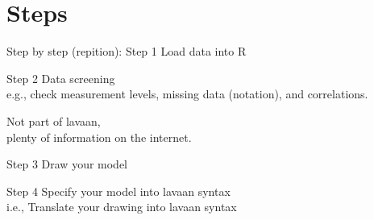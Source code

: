 \documentclass[10pt]{beamer}\usepackage[]{graphicx}\usepackage[]{xcolor}
\begin{document}
%
%
%
%
%
%
%
%
%
%
%
%
\section{Steps}
%
\begin{frame}{Step by step (repition): Step 1}
\Large Load data into R 
\end{frame}
\begin{frame}{Step 2}
\Large Data screening\\
e.g., check measurement levels, missing data (notation),
and correlations.

\vspace{5mm}

Not part of lavaan,\\
plenty of information on the internet.
\end{frame}
\begin{frame}{Step 3}
\Large Draw your model
\end{frame}
\begin{frame}{Step 4}
\Large Specify your model into lavaan syntax\\
i.e., Translate your drawing into lavaan syntax
\end{frame}
\end{document}
